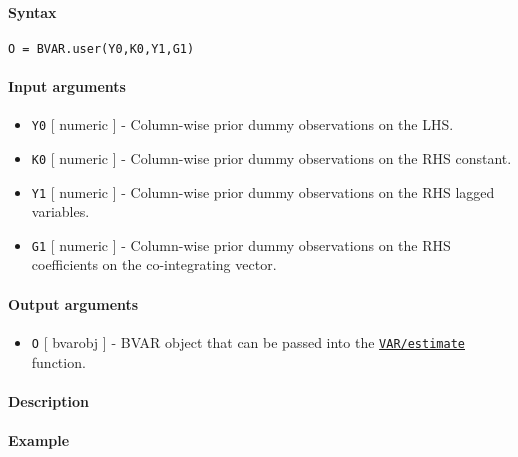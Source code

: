 


	\paragraph{Syntax}\label{syntax}

\begin{verbatim}
O = BVAR.user(Y0,K0,Y1,G1)
\end{verbatim}

\paragraph{Input arguments}\label{input-arguments}

\begin{itemize}
\item
  \texttt{Y0} {[} numeric {]} - Column-wise prior dummy observations on
  the LHS.
\item
  \texttt{K0} {[} numeric {]} - Column-wise prior dummy observations on
  the RHS constant.
\item
  \texttt{Y1} {[} numeric {]} - Column-wise prior dummy observations on
  the RHS lagged variables.
\item
  \texttt{G1} {[} numeric {]} - Column-wise prior dummy observations on
  the RHS coefficients on the co-integrating vector.
\end{itemize}

\paragraph{Output arguments}\label{output-arguments}

\begin{itemize}
\itemsep1pt\parskip0pt
\item
  \texttt{O} {[} bvarobj {]} - BVAR object that can be passed into the
  \href{VAR/estimate}{\texttt{VAR/estimate}} function.
\end{itemize}

\paragraph{Description}\label{description}

\paragraph{Example}\label{example}


